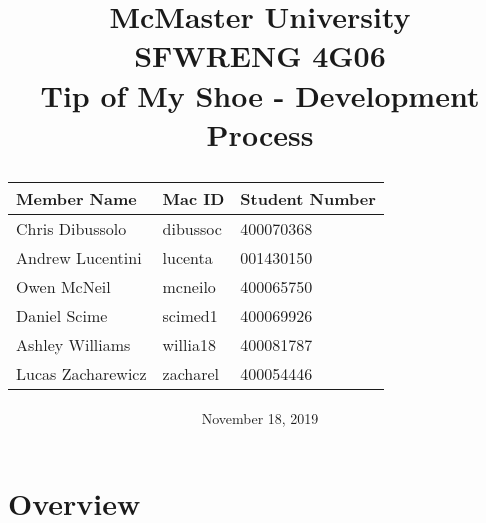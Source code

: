 \documentclass[12pt, titlepage]{article}
\title{
McMaster University\\
SFWRENG 4G06\\
\bigskip\bigskip\bigskip
{\bf Tip of My Shoe - Development Process\\}
\bigskip\bigskip\bigskip\bigskip
\begin{table}[h!]
\begin{center}
\begin{tabular}{|p{5cm}|p{5cm}|p{5cm}|}
	\hline
	\bf Member Name & \bf Mac ID & \bf Student Number\\
	\hline
	\hline
	Chris Dibussolo & dibussoc & 400070368\\
	\hline
    Andrew Lucentini & lucenta & 001430150\\
    \hline
	Owen McNeil & mcneilo & 400065750 \\
	\hline
	Daniel Scime & scimed1 & 400069926\\
	\hline
    Ashley Williams & willia18 & 400081787\\
	\hline
      Lucas Zacharewicz & zacharel & 400054446\\
	\hline
\end{tabular}
\end{center}
\end{table}
\date{November 18, 2019}
}
\begin{document}
\maketitle
\tableofcontents
\newpage


\section{Overview}

% 
% 
\end{document}
